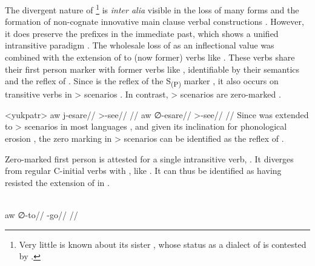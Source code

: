 \subsubsection{\yukpa {}}
\label{sec:yukpa}
The divergent nature of \yukpa\footnote{Very little is known about its sister \japreria, whose status as a dialect of \yukpa is contested by \textcite{oquendo2004japreria}.} is \textit{inter alia} visible in the loss of many \setone forms and the formation of non-cognate innovative main clause verbal constructions \parencite{meira2006syntactic}.
However, it does preserve the \setone prefixes in the immediate past, which shows a unified intransitive paradigm .
The wholesale loss of  as an inflectional value was combined with the extension of   to (now former)  verbs like  .
%
%
%
These verbs share their first person marker  with former  verbs like  , identifiable by their semantics and the reflex of \detrz.
Since  is the reflex of the \PC {}S\textsubscript{(P)} marker  \parencite[92]{gildea1998}, it also occurs on transitive verbs in > scenarios .
In contrast, > scenarios are zero-marked .

\pex<yukpatr>\yukpa \parencite[][139]{meira2006syntactic}
\begingl
\gla aw j-esare//
\glb {} >-see//
\glft {}//
\endgl
{}
\begingl
\gla aw {\normalfont ∅}-esare//
\glb {} >-see//
\glft {}//
\endgl
\xe
%
Since \PC {}  was extended to > scenarios in most languages \parencite[81--82]{gildea1998}, and given its inclination for phonological erosion , the zero marking in > scenarios can be identified as the \yukpa reflex of  .

Zero-marked first person is attested for a single intransitive verb,   .
It diverges from regular C-initial verbs with , like  .
It can thus be identified as having resisted the extension of  in \yukpa.

\yukpa \parencite[][139]{meira2006syntactic}\\
\begingl
\gla aw {\normalfont ∅}-to//
\glb {} -go//
\glft {}//
\endgl
\xe

